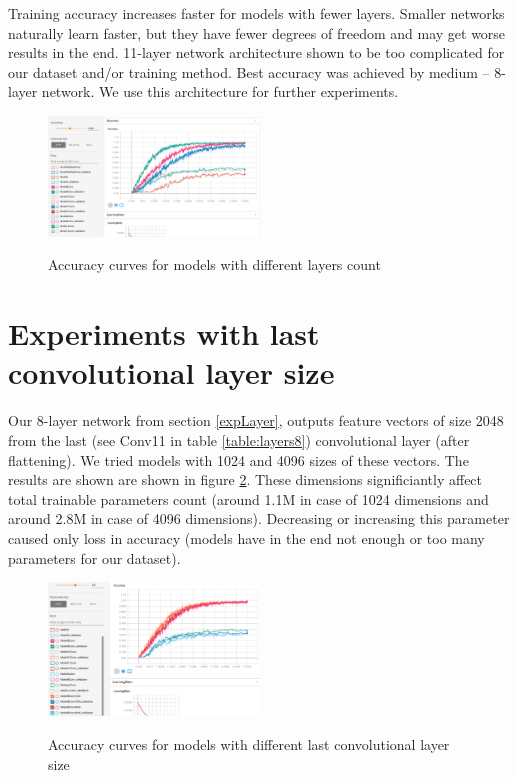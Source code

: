 \documentclass[a4paper]{article}
\begin{document}
Training accuracy increases faster for models with fewer layers.
Smaller networks naturally learn faster, but they have fewer degrees of freedom
and may get worse results in the end.
11-layer network architecture shown to be too complicated for
our dataset and/or training method.
Best accuracy was achieved by medium -- 8-layer network.
We use this architecture for further experiments.

\begin{figure}[!hbt]
    \centering
    \includegraphics[page=2,width=0.5\textwidth]{curvesLayers.png}
    \label{fig:layersAcc}
    \caption[]{Accuracy curves for models with different layers count}
\end{figure}

\section{Experiments with last convolutional layer size}

Our 8-layer network from section \ref{expLayer}, outputs
feature vectors of size 2048 from the last (see Conv11 in table \ref{table:layers8}) convolutional layer (after flattening).
We tried models with 1024 and 4096 sizes of these vectors.
The results are shown are shown in figure \ref{fig:lastSize}.
These dimensions significiantly affect total trainable parameters count
(around 1.1M in case of 1024 dimensions and around 2.8M in case of 4096 dimensions).
Decreasing or increasing this parameter caused only loss in accuracy
(models have in the end not enough or too many parameters for our dataset).

\begin{figure}[!hbt]
    \centering
    \includegraphics[page=2,width=0.5\textwidth]{lastConvSize.png}
    \label{fig:lastSize}
    \caption[]{Accuracy curves for models with different last convolutional layer size}
\end{figure}
\end{document}
